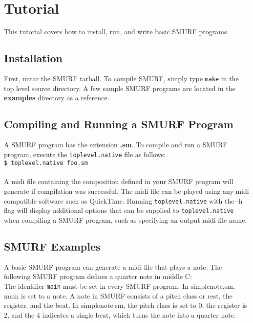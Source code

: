 \section{Tutorial}
This tutorial covers how to install, run, and write basic SMURF programs.

\subsection{Installation} 
First, untar the SMURF tarball. To compile SMURF, simply type \texttt{make} in the top level source directory. A few sample SMURF programs are located in the \textbf{examples} directory as a reference.

\subsection{Compiling and Running a SMURF Program}
A SMURF program has the extension \textbf{.sm}. To compile and run a SMURF program, execute the \texttt{toplevel.native} file as follows:\\

\texttt{\$ toplevel.native foo.sm}\\\\
A midi file containing the composition defined in your SMURF program will generate if compilation was successful. The midi file can be played using any midi compatible software such as QuickTime. Running \texttt{toplevel.native} with the -h flag will display additional options that can be supplied to \texttt{toplevel.native} when compiling a SMURF program, such as specifying an output midi file name.

\subsection{SMURF Examples}

A basic SMURF program can generate a midi file that plays a note. The following SMURF program defines a quarter note in middle C:\\



The identifier \texttt{main} must be set in every SMURF program. In simplenote.sm, main is set to a note.  A note in SMURF consists of a pitch class or rest, the register, and the beat. In simplenote.sm, the pitch class is set to 0, the register is 2, and the 4 indicates a single beat, which turns the note into a quarter note.

